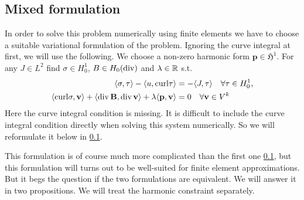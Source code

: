 \documentclass[../master_thesis.tex]{subfiles}
\begin{document}
\subsection{Mixed formulation}
In order to solve this problem numerically using finite elements we have to 
choose a suitable variational formulation of the problem. Ignoring the curve integral 
at first, we will use the following. We choose a non-zero harmonic form 
$\mathbf{p} \in \mathfrak{H}^1$.
For any $J \in L^2$ find $\sigma \in H^1_0$, 
$B \in H_0(\operatorname{div})$ and $\lambda \in \mathbb{R}$ s.t.
\begin{align}
    \langle \sigma, \tau \rangle - \langle u, \mathbf{\operatorname{curl}}\tau \rangle 
        &=  -\langle J, \tau \rangle \quad \forall \tau \in H^1_0, \label{eq:first_eq_mixed_formulation}
    \\ \langle \mathbf{\operatorname{curl}}\sigma, \mathbf{v} \rangle + \langle \operatorname{div} \mathbf{B}, \operatorname{div} \mathbf{v} \rangle 
        + \lambda \langle \mathbf{p}, \mathbf{v} \rangle 
        &= 0 \quad \forall \mathbf{v} \in V^k \label{eq:second_eq_mixed_formulation}
\end{align} 
Here the curve integral condition is missing. It is difficult to include the curve integral 
condition directly when solving this system numerically. So we will reformulate it below 
in \ref{}.

This formulation is of course much more complicated than the first one \ref{}, 
but this formulation will turns out to be well-suited for finite element approximations.
But it begs the question if the two formulations are equivalent. We will answer it 
in two propositions. We will treat the harmonic constraint separately.
\end{document}
